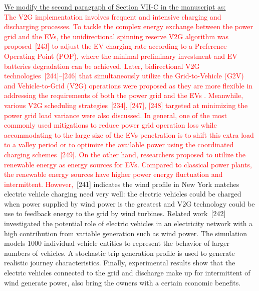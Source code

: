 \documentclass[onecolumn]{IEEEconf}
\begin{document}
\begin{description}
\underline{We modify the second paragraph of Section VII-C in the manuscript as:}\\
\textcolor{red}{The V2G implementation involves frequent and intensive charging and discharging processes. To tackle the complex energy exchange between the power grid and the EVs, the unidirectional spinning reserve V2G algorithm was proposed~[243] to adjust the EV charging rate according to a Preference Operating Point (POP), where the minimal preliminary investment and EV batteries degradation can be achieved. Later, bidirectional V2G technologies~[244]--[246] that simultaneously utilize the Grid-to-Vehicle (G2V) and Vehicle-to-Grid (V2G) operations were proposed as they are more flexible in addressing the requirements of both the power grid and the EVs . Meanwhile, various V2G scheduling strategies~[234], [247], [248] targeted at minimizing the power grid load variance were also discussed. In general, one of the most commonly used mitigations to reduce power grid operation loss while accommodating to the large size of the EVs penetration is to shift this extra load to a valley period or to optimize the available power using the coordinated charging schemes~[249]. On the other hand, researchers proposed to utilize the renewable energy as energy sources for EVs. Compared to classical power plants, the renewable energy sources have higher power energy fluctuation and intermittent. However,}~[241] indicates the wind profile in New York matches electric vehicle charging need very well: the electric vehicles could be charged when power supplied by wind power is the greatest and V2G technology could be use to feedback energy to the grid by wind turbines.
Related work~[242] investigated the potential role of electric vehicles in an electricity network with a high contribution from variable generation such as wind power. The simulation models 1000 individual vehicle entities to represent the behavior of larger numbers of vehicles. 
A stochastic trip generation profile is used to generate realistic journey characteristics. 
Finally, experimental results show that the electric vehicles connected to the grid and discharge make up for intermittent of wind generate power, also bring the owners with a certain economic benefits.
\\
\end{description}
\end{document}
